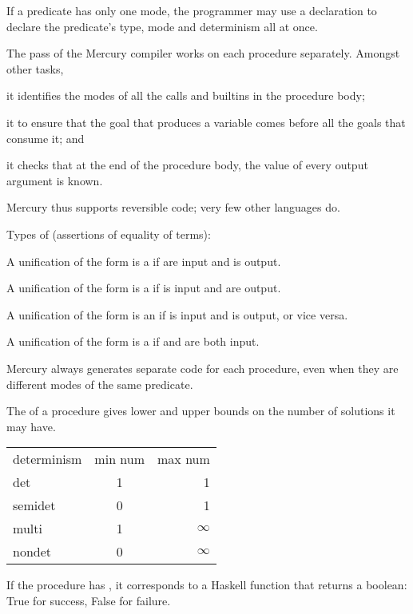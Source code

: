 \begin{compactitem}
If a predicate has only one mode, the programmer
may use a  declaration to declare the predicate’s type, mode and determinism all at once.

The  pass of the Mercury compiler
works on each procedure separately. Amongst other
tasks,
\begin{compactitem}
\item it identifies the modes of all the calls and
builtins in the procedure body;
\item it  to ensure that the goal
that produces a variable comes before all the
goals that consume it; and
\item it checks that at the end of the procedure body,
the value of every output argument is known.
\end{compactitem}

Mercury thus supports reversible code; very few
other languages do.

\item Types of  (assertions of equality of terms):
\begin{compactitem}
\item A unification of the form 
is a  if  are
input and  is output.
\item A unification of the form 
is a  if  is input and
 are output.
\item A unification of the form  is an  if  is input and  is output,
or vice versa.
\item A unification of the form  is a  if  and  are both input.
\end{compactitem}
\item Mercury always generates separate code
for each procedure, even when they are different
modes of the same predicate.
\item The  of a procedure gives lower and upper bounds on the number of solutions it may have. 
\item 
\begin{tabular}{ l c r }
  determinism & min num & max num \\
  det & 1 & 1 \\
  semidet & 0 & 1 \\
  multi & 1 & $\infty$ \\
  nondet & 0 & $\infty$ \\
\end{tabular}
\item If the procedure has , it
corresponds to a Haskell function that returns
a boolean: True for success, False for failure.
\end{compactitem}

